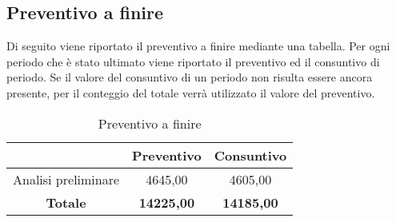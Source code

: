 \subsection{Preventivo a finire} \label{subsection:preventivo_a_finire}
Di seguito viene riportato il preventivo a finire mediante una tabella.
Per ogni periodo che è stato ultimato viene riportato il preventivo ed il consuntivo di periodo.
Se il valore del consuntivo di un periodo non risulta essere ancora presente, per il conteggio del totale verrà utilizzato il valore del preventivo.
\begin{table}[H]
    \centering
    \renewcommand{\arraystretch}{1.8}
    \begin{tabular}{c|c|c}
      \rowcolor[HTML]{125E28} 
      \multicolumn{1}{c}{\color[HTML]{FFFFFF}\textbf{Periodo}}
      & \multicolumn{1}{c}{\color[HTML]{FFFFFF}\textbf{Preventivo}}
      & \multicolumn{1}{c}{\color[HTML]{FFFFFF}\textbf{Consuntivo}}\\
      \hline
      Analisi preliminare     & 4645,00 & 4605,00\\

      \textbf{Totale} & \textbf{14225,00} & \textbf{14185,00}\\
    \end{tabular}
    \caption{Preventivo a finire}
  \end{table}
